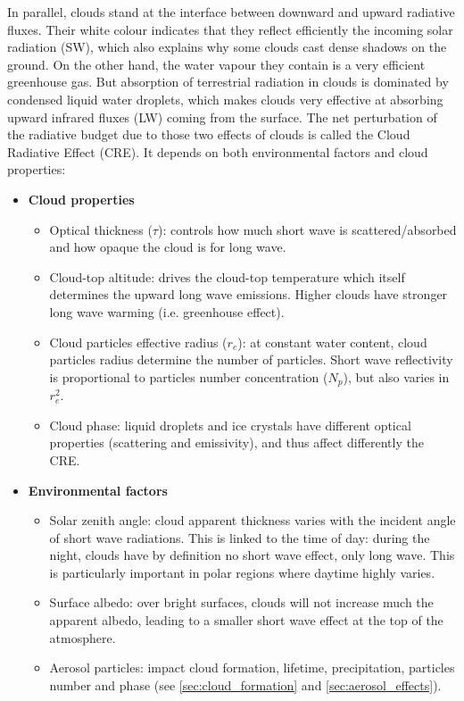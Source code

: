     In parallel, clouds stand at the interface between downward and upward radiative fluxes. Their white colour indicates that they reflect efficiently the incoming solar radiation (SW), which also explains why some clouds cast dense shadows on the ground. On the other hand, the water vapour they contain is a very efficient greenhouse gas. But absorption of terrestrial radiation in clouds is dominated by condensed liquid water droplets, which makes clouds very effective at absorbing upward infrared fluxes (LW) coming from the surface.
    The net perturbation of the radiative budget due to those two effects of clouds is called the Cloud Radiative Effect (CRE). It depends on both environmental factors and cloud properties:
    \begin{itemize}
        \item \textbf{Cloud properties}
        \begin{itemize}
            \item Optical thickness ($\tau$): controls how much short wave is scattered/absorbed and how opaque the cloud is for long wave.
            \item Cloud-top altitude: drives the cloud-top temperature which itself determines the upward long wave emissions. Higher clouds have stronger long wave warming (i.e. greenhouse effect).
            \item Cloud particles effective radius ($r_e$): at constant water content, cloud particles radius determine the number of particles. Short wave reflectivity is proportional to particles number concentration ($N_p$), but also varies in $r_e^2$.
            \item Cloud phase: liquid droplets and ice crystals have different optical properties (scattering and emissivity), and thus affect differently the CRE.
        \end{itemize}

        \item \textbf{Environmental factors}
        \begin{itemize}
            \item Solar zenith angle: cloud apparent thickness varies with the incident angle of short wave radiations. This is linked to the time of day: during the night, clouds have by definition no short wave effect, only long wave. This is particularly important in polar regions where daytime highly varies.
            \item Surface albedo: over bright surfaces, clouds will not increase much the apparent albedo, leading to a smaller short wave effect at the top of the atmosphere.
            \item Aerosol particles: impact cloud formation, lifetime, precipitation, particles number and phase (see \cref{sec:cloud_formation} and \cref{sec:aerosol_effects}).
        \end{itemize}
    \end{itemize}

